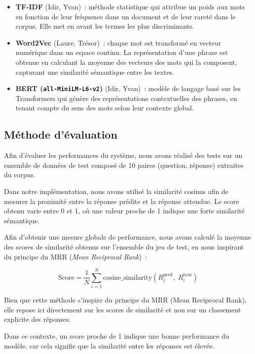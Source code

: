\documentclass[12pt,a4paper]{report}
\begin{document}
\begin{itemize}
    \item \textbf{TF-IDF} (Idir, Yvan)~: méthode statistique qui attribue un poids aux mots en fonction de leur fréquence dans un document et de leur rareté dans le corpus. Elle met en avant les termes les plus discriminants.
    \item \textbf{Word2Vec} (Laure, Trésor)~: chaque mot est transformé en vecteur numérique dans un espace continu. La représentation d'une phrase est obtenue en calculant la moyenne des vecteurs des mots qui la composent, capturant une similarité sémantique entre les textes.
    \item \textbf{BERT (\texttt{all-MiniLM-L6-v2})} (Idir, Yvan)~: modèle de langage basé sur les Transformers qui génère des représentations contextuelles des phrases, en tenant compte du sens des mots selon leur contexte global.
\end{itemize}

\newpage

\subsection{Méthode d'évaluation}

Afin d'évaluer les performances du système, nous avons réalisé des tests sur un ensemble de données de test composé de 10 paires (question, réponse) extraites du corpus.

Dans notre implémentation, nous avons utilisé la similarité cosinus afin de mesurer la proximité entre la réponse prédite et la réponse attendue. Le score obtenu varie entre 0 et 1, où une valeur proche de 1 indique une forte similarité sémantique.

Afin d'obtenir une mesure globale de performance, nous avons calculé la moyenne des scores de similarité obtenus sur l'ensemble du jeu de test, en nous inspirant du principe du MRR (\textit{Mean Reciprocal Rank})~:

\[
\text{Score} = \frac{1}{N} \sum_{i=1}^{N} \text{cosine\_similarity}(R^{\text{pred}}_i,\; R^{\text{true}}_i)
\]

Bien que cette méthode s’inspire du principe du MRR (Mean Reciprocal Rank), elle repose ici directement
sur les scores de similarité et non sur un classement explicite des réponses.

Dans ce contexte, un score proche de 1 indique une bonne performance du modèle, 
car cela signifie que la similarité entre les réponses est élevée.
\end{document}
